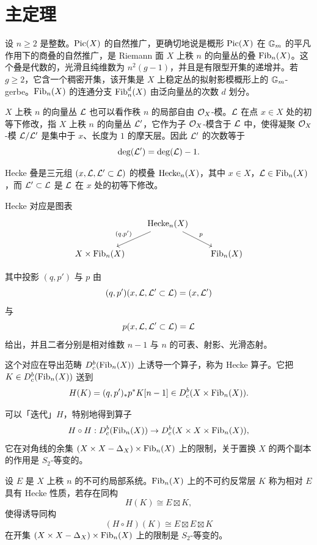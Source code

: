 \section{主定理}

设 $n\ge 2$ 是整数。$\operatorname{Pic}(X)$ 的自然推广，更确切地说是概形 $\operatorname{Pic}(X)$ 在 $\mathbb{G}_m$ 的平凡作用下的商叠的自然推广，是 Riemann 面 $X$ 上秩 $n$ 的向量丛的叠 $\operatorname{Fib}_n(X)$。这个叠是代数的，光滑且纯维数为 $n^2(g-1)$，并且是有限型开集的递增并。若 $g\ge 2$，它含一个稠密开集，该开集是 $X$ 上稳定丛的拟射影模概形上的 $\mathbb{G}_m$-gerbe。$\operatorname{Fib}_n(X)$ 的连通分支 $\operatorname{Fib}_n^d(X)$ 由泛向量丛的次数 $d$ 划分。


$X$ 上秩 $n$ 的向量丛 $\mathcal{L}$ 也可以看作秩 $n$ 的局部自由 $\mathcal{O}_X$-模。$\mathcal{L}$ 在点 $x\in X$ 处的初等下修改，指 $X$ 上秩 $n$ 的向量丛 $\mathcal{L}'$，它作为子 $\mathcal{O}_X$-模含于 $\mathcal{L}$ 中，使得凝聚 $\mathcal{O}_X$-模 $\mathcal{L}/\mathcal{L}'$ 是集中于 $x$、长度为 $1$ 的摩天层。因此 $\mathcal{L}'$ 的次数等于
\[
  \deg(\mathcal{L}') = \deg(\mathcal{L}) - 1.
\]

Hecke 叠是三元组 $(x,\mathcal{L},\mathcal{L}'\subset\mathcal{L})$ 的模叠 $\operatorname{Hecke}_n(X)$，其中 $x\in X$，$\mathcal{L}\in\operatorname{Fib}_n(X)$，而 $\mathcal{L}'\subset\mathcal{L}$ 是 $\mathcal{L}$ 在 $x$ 处的初等下修改。

Hecke 对应是图表
\[
  \begin{tikzcd}[column sep=1.8em, row sep=1.8em]
    & \Hck_n(X) \arrow[dl, "{(q,p')}"'] \arrow[dr, "p"] & \\
    X\times\Fib_n(X) & & \Fib_n(X)
  \end{tikzcd}
\]

其中投影 $(q,p')$ 与 $p$ 由
\[
  (q,p')(x,\mathcal{L},\mathcal{L}'\subset\mathcal{L}) = (x,\mathcal{L}')
\]
与
\[
  p(x,\mathcal{L},\mathcal{L}'\subset\mathcal{L}) = \mathcal{L}
\]
给出，并且二者分别是相对维数 $n-1$ 与 $n$ 的可表、射影、光滑态射。

这个对应在导出范畴 $D^{b}_{c}(\operatorname{Fib}_n(X))$ 上诱导一个算子，称为 Hecke 算子。它把 $K\in D^{b}_{c}(\operatorname{Fib}_n(X))$ 送到
\[
  H(K) = (q,p')_* p^*K[n-1] \in D^{b}_{c}(X\times\operatorname{Fib}_n(X)).
\]

可以「迭代」$H$，特别地得到算子
\[
  H\circ H : D^{b}_{c}(\operatorname{Fib}_n(X)) \to D^{b}_{c}(X\times X\times\operatorname{Fib}_n(X)),
\]
它在对角线的余集 $(X\times X-\Delta_X)\times\operatorname{Fib}_n(X)$ 上的限制，关于置换 $X$ 的两个副本的作用是 $S_2$-等变的。

\begin{definition}
设 $E$ 是 $X$ 上秩 $n$ 的不可约局部系统。$\operatorname{Fib}_n(X)$ 上的不可约反常层 $K$ 称为相对 $E$ 具有 Hecke 性质，若存在同构
\[
  H(K)\cong E\boxtimes K,
\]
使得诱导同构
\[
  (H\circ H)(K)\cong E\boxtimes E\boxtimes K
\]
在开集 $(X\times X-\Delta_X)\times\operatorname{Fib}_n(X)$ 上的限制是 $S_2$-等变的。
\end{definition}


